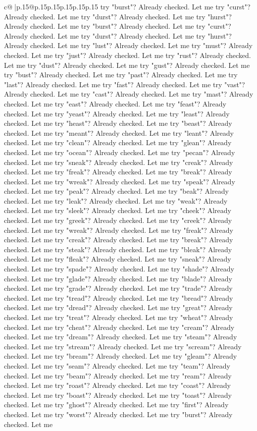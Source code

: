 \documentclass{article}
\begin{document}
{\begin{supertabular}{c@{$\;$}|p{.15\linewidth}@{}p{.15\linewidth}p{.15\linewidth}p{.15\linewidth}p{.15\linewidth}p{.15\linewidth}}
{{{try "burst"? Already checked. Let me try "curst"? Already checked. Let me try "durst"? Already checked. Let me try "hurst"? Already checked. Let me try "burst"? Already checked. Let me try "curst"? Already checked. Let me try "durst"? Already checked. Let me try "hurst"? Already checked. Let me try "lust"? Already checked. Let me try "must"? Already checked. Let me try "just"? Already checked. Let me try "rust"? Already checked. Let me try "dust"? Already checked. Let me try "gust"? Already checked. Let me try "bust"? Already checked. Let me try "past"? Already checked. Let me try "last"? Already checked. Let me try "fast"? Already checked. Let me try "vast"? Already checked. Let me try "cast"? Already checked. Let me try "mast"? Already checked. Let me try "east"? Already checked. Let me try "feast"? Already checked. Let me try "yeast"? Already checked. Let me try "least"? Already checked. Let me try "heast"? Already checked. Let me try "beast"? Already checked. Let me try "meant"? Already checked. Let me try "leant"? Already checked. Let me try "clean"? Already checked. Let me try "glean"? Already checked. Let me try "ocean"? Already checked. Let me try "pecan"? Already checked. Let me try "sneak"? Already checked. Let me try "creak"? Already checked. Let me try "freak"? Already checked. Let me try "break"? Already checked. Let me try "wreak"? Already checked. Let me try "speak"? Already checked. Let me try "peak"? Already checked. Let me try "beak"? Already checked. Let me try "leak"? Already checked. Let me try "weak"? Already checked. Let me try "sleek"? Already checked. Let me try "cheek"? Already checked. Let me try "greek"? Already checked. Let me try "creek"? Already checked. Let me try "wreak"? Already checked. Let me try "freak"? Already checked. Let me try "creak"? Already checked. Let me try "break"? Already checked. Let me try "steak"? Already checked. Let me try "bleak"? Already checked. Let me try "fleak"? Already checked. Let me try "sneak"? Already checked. Let me try "spade"? Already checked. Let me try "shade"? Already checked. Let me try "glade"? Already checked. Let me try "blade"? Already checked. Let me try "grade"? Already checked. Let me try "trade"? Already checked. Let me try "tread"? Already checked. Let me try "bread"? Already checked. Let me try "dread"? Already checked. Let me try "great"? Already checked. Let me try "treat"? Already checked. Let me try "wheat"? Already checked. Let me try "cheat"? Already checked. Let me try "cream"? Already checked. Let me try "dream"? Already checked. Let me try "steam"? Already checked. Let me try "stream"? Already checked. Let me try "scream"? Already checked. Let me try "bream"? Already checked. Let me try "gleam"? Already checked. Let me try "seam"? Already checked. Let me try "team"? Already checked. Let me try "beam"? Already checked. Let me try "ream"? Already checked. Let me try "roast"? Already checked. Let me try "coast"? Already checked. Let me try "boast"? Already checked. Let me try "toast"? Already checked. Let me try "ghost"? Already checked. Let me try "first"? Already checked. Let me try "worst"? Already checked. Let me try "burst"? Already checked. Let me }}}
\end{supertabular}}
\end{document}
